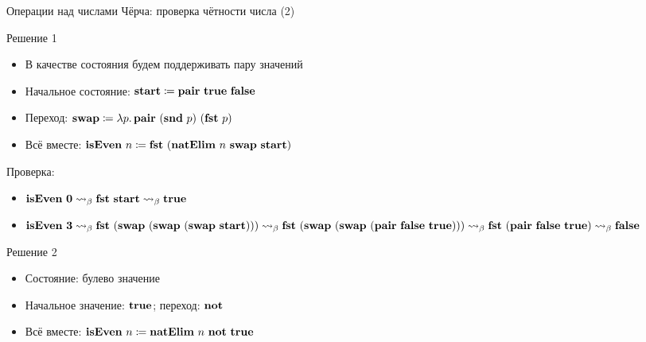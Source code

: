     \begin{frame}{Операции над числами Чёрча: проверка чётности числа (2)}
        \vspace{-0.7em}
        \begin{block}{Решение 1}
            \begin{itemize}
                \item В качестве состояния будем поддерживать пару значений
                \item Начальное состояние: $\mathbf{start} \coloneqq \mathbf{pair} ~ \mathbf{true} ~ \mathbf{false}$
                \item Переход: $\mathbf{swap} \coloneqq \lambda p\ldotp \mathbf{pair} ~ (\mathbf{snd} ~ p) ~ (\mathbf{fst} ~ p)$
                \item  Всё вместе:  $\mathbf{isEven} ~ n \coloneqq  \mathbf{fst} ~ (\mathbf{natElim} ~ n ~ \mathbf{swap} ~ \mathbf{start})$
            \end{itemize}
            \pause
            Проверка:
            \begin{itemize}
                \item $\mathbf{isEven} ~ \mathbf{0} \rightsquigarrow_\beta  \mathbf{fst} ~ \mathbf{start} \rightsquigarrow_\beta \mathbf{true}$
                \item  $\mathbf{isEven} ~ \mathbf{3} \rightsquigarrow_\beta  \mathbf{fst} ~ (\mathbf{swap} ~ (\mathbf{swap} ~ (\mathbf{swap} ~ \mathbf{start}))) \rightsquigarrow_\beta   \mathbf{fst} ~ (\mathbf{swap} ~ (\mathbf{swap} ~ (\mathbf{pair} ~ \mathbf{false} ~ \mathbf{true}))) \rightsquigarrow_\beta  \mathbf{fst} ~ (\mathbf{pair} ~ \mathbf{false} ~ \mathbf{true}) \rightsquigarrow_\beta  \mathbf{false}$
            \end{itemize}
        \end{block}
        \vspace{-0.5em}
        \pause
        \begin{block}{Решение 2}
            \begin{itemize}
                \item Состояние: булево значение
                \item Начальное значение: $\mathbf{true}$; переход: $\mathbf{not}$
                \item Всё вместе: $\mathbf{isEven} ~ n \coloneqq \mathbf{natElim} ~ n ~ \mathbf{not} ~ \mathbf{true}$
            \end{itemize}
        \end{block}
    \end{frame}


